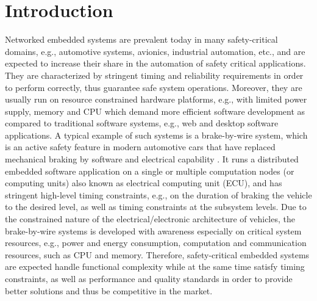 \chapter{Introduction}\label{chapter_introduction}
Networked embedded systems are prevalent today in many safety-critical domains, e.g., automotive systems, avionics, industrial automation, etc., and are expected to increase their share in the automation of safety critical applications. They are characterized by stringent timing and reliability requirements in order to perform correctly, thus guarantee safe system operations. Moreover, they are usually run on resource constrained hardware platforms, e.g., with limited power supply, memory and CPU which demand more efficient software development \cite{es} as compared to traditional software systems, e.g., web and desktop software applications. A typical example of such systems is a brake-by-wire system, which is an active safety feature in modern automotive cars that have replaced mechanical braking by software and electrical capability \cite{ref}. It runs a distributed embedded software application on a single or multiple computation nodes (or computing units) also known as electrical computing unit (ECU), and has stringent high-level timing constraints, e.g., on the duration of braking the vehicle to the desired level, as well as timing constraints at the subsystem levels. Due to the constrained nature of the electrical/electronic architecture of vehicles, the brake-by-wire systems is developed with awareness especially on critical system resources, e.g., power and energy consumption, computation and communication resources, such as CPU and memory. Therefore, safety-critical embedded systems are expected handle functional complexity while at the same time satisfy timing constraints, as well as performance and quality standards in order to provide better solutions and thus be competitive in the market.

